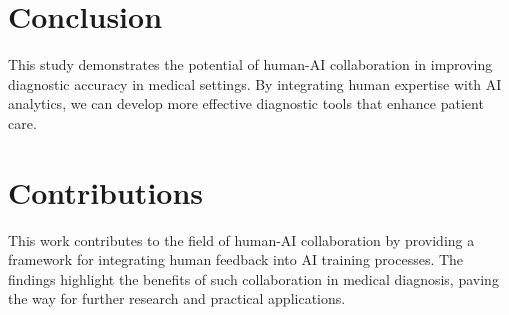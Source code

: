 \documentclass{article}
\begin{document}
\section{Conclusion}
This study demonstrates the potential of human-AI collaboration in improving diagnostic accuracy in medical settings. By integrating human expertise with AI analytics, we can develop more effective diagnostic tools that enhance patient care.

\section{Contributions}
This work contributes to the field of human-AI collaboration by providing a framework for integrating human feedback into AI training processes. The findings highlight the benefits of such collaboration in medical diagnosis, paving the way for further research and practical applications.
\end{document}
